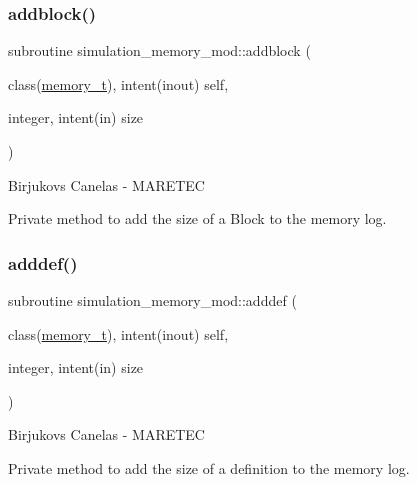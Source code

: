 \subsubsection{\texorpdfstring{addblock()}{addblock()}}
{\footnotesize\ttfamily subroutine simulation\+\_\+memory\+\_\+mod\+::addblock (\begin{DoxyParamCaption}\item[{class(\hyperlink{structsimulation__memory__mod_1_1memory__t}{memory\+\_\+t}), intent(inout)}]{self,  }\item[{integer, intent(in)}]{size }\end{DoxyParamCaption})\hspace{0.3cm}{\ttfamily [private]}}



Birjukovs Canelas -\/ M\+A\+R\+E\+T\+EC 

Private method to add the size of a Block to the memory log. \mbox{\label{namespacesimulation__memory__mod_ac6d6853bc462947d24a8f6234d625138}} 
\subsubsection{\texorpdfstring{adddef()}{adddef()}}
{\footnotesize\ttfamily subroutine simulation\+\_\+memory\+\_\+mod\+::adddef (\begin{DoxyParamCaption}\item[{class(\hyperlink{structsimulation__memory__mod_1_1memory__t}{memory\+\_\+t}), intent(inout)}]{self,  }\item[{integer, intent(in)}]{size }\end{DoxyParamCaption})\hspace{0.3cm}{\ttfamily [private]}}



Birjukovs Canelas -\/ M\+A\+R\+E\+T\+EC 

Private method to add the size of a definition to the memory log. \mbox{\label{namespacesimulation__memory__mod_a940ff42fa3a49423f9ac98da2bffa54c}} 
